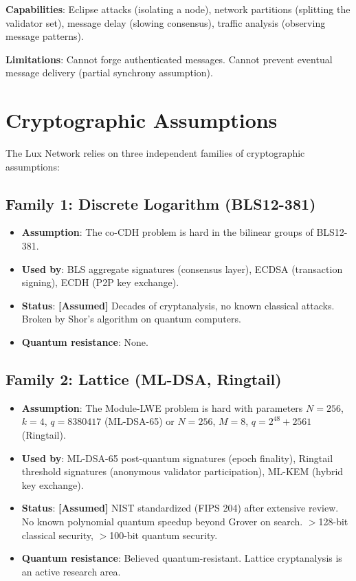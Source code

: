 \documentclass[11pt,a4paper]{article}
\begin{document}
\textbf{Capabilities}: Eclipse attacks (isolating a node), network partitions (splitting
the validator set), message delay (slowing consensus), traffic analysis (observing
message patterns).

\textbf{Limitations}: Cannot forge authenticated messages. Cannot prevent eventual
message delivery (partial synchrony assumption).

\section{Cryptographic Assumptions}
\label{sec:assumptions}

The Lux Network relies on three independent families of cryptographic assumptions:

\subsection{Family 1: Discrete Logarithm (BLS12-381)}

\begin{itemize}[leftmargin=2em]
  \item \textbf{Assumption}: The co-CDH problem is hard in the bilinear groups of
        BLS12-381.
  \item \textbf{Used by}: BLS aggregate signatures (consensus layer), ECDSA
        (transaction signing), ECDH (P2P key exchange).
  \item \textbf{Status}: \textbf{[Assumed]} Decades of cryptanalysis, no known
        classical attacks. Broken by Shor's algorithm on quantum computers.
  \item \textbf{Quantum resistance}: None.
\end{itemize}

\subsection{Family 2: Lattice (ML-DSA, Ringtail)}

\begin{itemize}[leftmargin=2em]
  \item \textbf{Assumption}: The Module-LWE problem is hard with parameters $N = 256$,
        $k = 4$, $q = 8380417$ (ML-DSA-65) or $N = 256$, $M = 8$,
        $q = 2^{48} + 2561$ (Ringtail).
  \item \textbf{Used by}: ML-DSA-65 post-quantum signatures (epoch finality),
        Ringtail threshold signatures (anonymous validator participation), ML-KEM
        (hybrid key exchange).
  \item \textbf{Status}: \textbf{[Assumed]} NIST standardized (FIPS 204) after
        extensive review. No known polynomial quantum speedup beyond Grover on
        search. $>$128-bit classical security, $>$100-bit quantum security.
  \item \textbf{Quantum resistance}: Believed quantum-resistant. Lattice
        cryptanalysis is an active research area.
\end{itemize}
\end{document}
